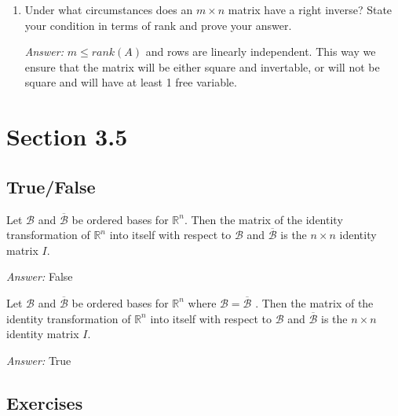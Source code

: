\documentclass[letterpaper]{article}
\newcommand{\ans}{\textit{Answer: }}
\newenvironment{question}[2][Question]{\begin{trivlist}
\item[\hskip \labelsep {\bfseries #1}\hskip \labelsep {\bfseries #2.}]}{\end{trivlist}}
\begin{document}
\begin{question}{3.88}
\begin{enumerate}[label=\textbf{(\alph*)}]
    \ans Let B to be the right inverse of A

    \begin{gather*}
      rank(AB) = rank(I) = 2 \\
      rank(AB) \leq rank(B) \leq 2
    \end{gather*}

    \item Under what circumstances does an $m \times n$ matrix have a right inverse?
    State your condition in terms of rank and prove your answer.

    \ans $m \leq rank(A)$ and rows are linearly independent. This way we ensure that
    the matrix will be either square and invertable, or will not be square and will have at 
    least 1 free variable. 
  \end{enumerate}
\end{question}

\section{Section 3.5}
\subsection{True/False}

\begin{question}{3.32}
  Let $\mathcal { B }$ and $\overline { \mathcal { B } }$ be ordered bases for 
  $\mathbb { R } ^ { n }$. Then the matrix of the identity transformation of 
  $\mathbb { R } ^ { n }$ into itself with respect to $\mathcal { B }$ and 
  $\overline { \mathcal { B } }$ is the $n \times n$ identity
  matrix $I .$
  
  \ans False

\end{question}

\begin{question}{3.33}
  Let $\mathcal { B }$ and $\overline { \mathcal { B } }$ be ordered bases for $\mathbb { R } ^ { n }$ where $\mathcal { B } = \overline { \mathcal { B } }$ . Then the matrix of the
  identity transformation of $\mathbb { R } ^ { n }$ into itself with respect to $\mathcal { B }$ and $\overline { \mathcal { B } }$ is the $n \times n$
  identity matrix $I .$

  \ans True
\end{question}

\subsection{Exercises}
\end{document}

